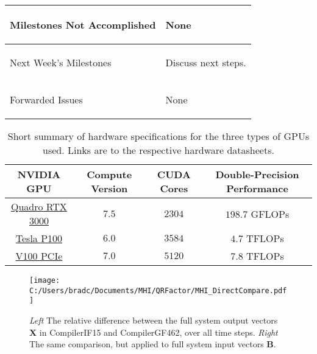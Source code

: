 \documentclass[11pt,letterpaper]{article}
\begin{document}
\begin{tabular}{| p{} | p{} |}
	Milestones Not \newline Accomplished & \begin{enumerate*}
	\item[\tiny\textbullet] None
	\end{enumerate*} \\ \hline

	Next Week's \newline Milestones & \begin{enumerate*}
    \item[\tiny\textbullet] Discuss next steps.
	\end{enumerate*} \\ \hline

	Forwarded Issues & \begin{enumerate*}
	\item[\tiny\textbullet] None
	\end{enumerate*} \\ \hline
\end{tabular}


\begin{table}[b]
    \begin{tabular}{| c | c | c | c |}
        \hline
        {\bf NVIDIA GPU} & {\bf Compute Version} & {\bf CUDA Cores} & {\bf Double-Precision Performance} \\ \hline
        \href{https://www.nvidia.com/content/dam/en-zz/Solutions/design-visualization/documents/quadro-mobile-line-card-n18-11x8.5-r4-hr.pdf}{Quadro RTX 3000} & $7.5$ & $2304$ & $198.7$ GFLOPs \\ \hline
        \href{https://images.nvidia.com/content/tesla/pdf/nvidia-tesla-p100-PCIe-datasheet.pdf}{Tesla P100} & $6.0$ & $3584$ & $4.7$ TFLOPs \\ \hline
        \href{https://images.nvidia.com/content/technologies/volta/pdf/volta-v100-datasheet-update-us-1165301-r5.pdf}{V100 PCIe} & $7.0$ & $5120$ & $7.8$ TFLOPs \\ \hline
    \end{tabular}
    \caption{Short summary of hardware specifications for the three types of GPUs used. Links are to the 
    respective hardware datasheets.}
    \label{t:gpu_stats}
\end{table}


\begin{figure}[!ht]
    \centering
    \texttt{[image: C:/Users/bradc/Documents/MHI/QRFactor/MHI\_DirectCompare.pdf]}
    \caption{\emph{Left} The relative difference between the full system output vectors $\mathbf{X}$ in 
    CompilerIF15 and CompilerGF462, over all time steps. \emph{Right} The same comparison, but applied 
    to full system input vectors $\mathbf{B}$.}
    \label{f:mhi_compare}
\end{figure}
\end{document}
